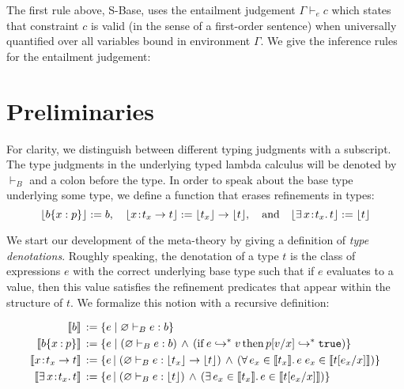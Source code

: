 \documentclass[11pt]{article}
\newcommand{\bind}{\hspace{0.1em}{:}\hspace{0.1em}} %
\newcommand{\col}{\mathbin{:}}       %
\newcommand{\lb}{\llbracket}         %
\newcommand{\rb}{\rrbracket}         %
\newcommand{\many}{\hookrightarrow^*}
\newcommand{\true}{\mathtt{true}}
\begin{document}
The first rule above, {\sc S-Base}, uses the entailment judgement $\Gamma \vdash_e c$ which states that constraint $c$ is valid (in the sense of a first-order sentence) when universally quantified over all variables bound in environment $\Gamma$.
We give the inference rules for the entailment judgement:



\section{Preliminaries}

For clarity, we distinguish between different typing judgments with a subscript.  The type judgments in the underlying typed lambda calculus will be denoted by $\vdash_B$ and a colon before the type. In order to speak about the base type underlying some type, we define a function that erases refinements in types:
\[
\lfloor b\{x:p\} \rfloor := b, \quad
\lfloor x\bind t_x \rightarrow t\rfloor := \lfloor t_x \rfloor \rightarrow \lfloor t \rfloor
, \quad{\rm and}\quad
\lfloor \exists\, x\bind t_x.\, t\rfloor := \lfloor t\rfloor
\]

We start our development of the meta-theory by giving a definition of {\em type denotations}. Roughly speaking, the denotation of a type $t$ is the class of expressions $e$ with the correct underlying base type such that if $e$ evaluates to a value, then this value satisfies the refinement predicates that appear within the structure of $t$. We formalize this notion with a recursive definition:

\begin{align*}
\lb b \rb \,&:= \{ e \;|\; \varnothing \vdash_B e : b\}\\
\lb b\{x\col p\}\rb \,&:= 
  \{ e \;|\; (\varnothing \vdash_B e:b)
\,\wedge\, ({\rm if}\, e \many v \,{\rm then}\, p[v/x] \many {\tt true})\} \\
\lb x\bind t_x \rightarrow t\rb \,&:= 
\{ e \,|\; (\varnothing \vdash_B e : \lfloor t_x\rfloor \rightarrow \lfloor t\rfloor ) \,\wedge\,
( \forall\, e_x \in \lb t_x \rb.\, e\; e_x \in \lb t[e_x/x] \rb)\} \\
\lb \exists\, x\bind t_x .\, t\rb \,&:= 
\{ e \,|\; (\varnothing \vdash_B e : \lfloor t\rfloor ) \,\wedge\,
( \exists\, e_x \in \lb t_x \rb.\, e \in \lb t[e_x/x] \rb)\}
\end{align*}
\end{document}

